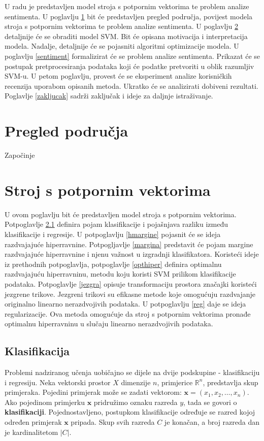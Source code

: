 \documentclass[times, utf8, zavrsni, numeric]{fer}
\begin{document}
\par U radu je predstavljen model stroja s potpornim vektorima te problem analize sentimenta.
U poglavlju \ref{ppodrucja} bit će predstavljen pregled područja, povijest modela stroja s potpornim vektorima te problem analize sentimenta.
U poglavlju \ref{svm} detaljnije će se obraditi model SVM.
Bit će opisana motivacija i interpretacija modela.
Nadalje, detaljnije će se pojasniti algoritmi optimizacije modela.
U poglavlju \ref{sentiment} formalizirat će se problem analize sentimenta.
Prikazat će se postupak pretprocesiranja podataka koji će podatke pretvoriti u oblik razumljiv SVM-u.
U petom poglavlju, provest će se eksperiment analize korisničkih recenzija uporabom opisanih metoda.
Ukratko će se analizirati dobiveni rezultati.
Poglavlje \ref{zakljucak} sadrži zaključak i ideje za daljnje istraživanje. 

\chapter{Pregled područja} \label{ppodrucja}
Započinje \cite{vapnik1963}

\chapter{Stroj s potpornim vektorima} \label{svm}
U ovom poglavlju bit će predstavljen model stroja s potpornim vektorima. 
Potpoglavlje \ref{klasifikacija} definira pojam klasifikacije i pojašnjava razliku između klasifikacije i regresije.
U potpoglavlju \ref{hmargine} pojasnit će se ideja razdvajajuće hiperravnine.
Potpogljavlje \ref{margina} predstavit će pojam margine razdvajajuće hiperravnine i njenu važnost u izgradnji
klasifikatora.
Koristeći ideje iz prethodnih potpoglavlja, potpoglavlje \ref{opthiper} definira optimalnu razdvajajuću hiperravninu,
metodu koju koristi SVM prilikom klasifikacije podataka.
Potpoglavlje \ref{jezgra} opisuje transformaciju prostora značajki koristeći jezgrene trikove.
Jezgreni trikovi su efikasne metode koje omogućuju razdvajanje originalno linearno nerazdvojivih podataka.
U potpoglavlju \ref{reg} daje se ideja regularizacije. Ova metoda omogućuje da stroj s potpornim vektorima
pronađe optimalnu hiperravninu u slučaju linearno nerazdvojivih podataka.

\section{Klasifikacija} \label{klasifikacija}
Problemi nadziranog učenja uobičajno se dijele na dvije podskupine - klasifikaciju i regresiju.
Neka vektorski prostor $\textit{X}$ dimenzije $n$, primjerice $\mathbb{R}^n$, predstavlja skup primjeraka. 
Pojedini primjerak može se zadati vektorom: $\mathbf{x}=(x_1,x_2,\dots,x_n)$.
Ako pojedinom primjerku $\mathbf{x}$ pridružimo oznaku razreda $y$, tada se govori o \textbf{klasifikaciji}.
Pojednostavljeno, postupkom klasifikacije određuje se razred kojoj određen primjerak $\mathbf{x}$ pripada.
Skup svih razreda $\textit{C}$ je konačan, a broj razreda dan je kardinalitetom $\left\vert{C}\right\vert$.
\end{document}
